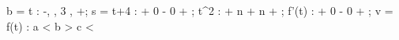 	b =     t : -\infty ,  , 3 , +\infty ;
	s =   t+4 :         +    0    - 0 +         ;
	      t^2 :         +    n    + n +         ;
	    f'(t) :         +    0    - 0 +         ;
	v =  f(t) :       a <    b    > c <  \beta